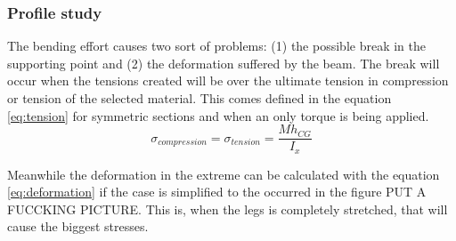 \subsubsection{Profile study} %
\label{ssub:profile_study}
  The bending effort causes two sort of problems: (1) the possible break in the supporting point and (2) the deformation suffered by the beam.
  The break will occur when the tensions created will be over the ultimate tension in compression or tension of the selected material.
  This comes defined in the equation \ref{eq:tension} for symmetric sections and when an only torque is being applied.
  \begin{equation}
  \label{eq:tension}
    \sigma _{compression} = \sigma _{tension} = \frac{M h_{CG}}{I_x}
  \end{equation}

  Meanwhile the deformation in the extreme can be calculated with the equation \ref{eq:deformation} if the case is simplified to the occurred in the figure PUT A FUCCKING PICTURE.
  This is, when the legs is completely stretched, that will cause the biggest stresses.

